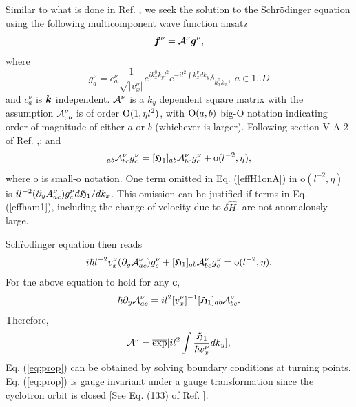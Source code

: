 \documentclass[aps, prb, showpacs, twocolumn, notitlepage, superscriptaddress]{revtex4-1}
\begin{document}
Similar to what is done in Ref. , we seek the solution to the Schr\"odinger equation using the following multicomponent wave function ansatz
\begin{equation}
\boldsymbol{f}^\nu={\cal A}^\nu\boldsymbol{g}^\nu,
\end{equation}
where 
\begin{equation}
g_a^\nu=c_{a}^\nu\frac{1}{\sqrt{|v_x^\nu|}}e^{ik^{0}_{x}k_{y}l^{2}}e^{-il^{2}\int k_{x}^\nu dk_{y}}\delta_{k^{0}_{x}k_{x}},~a\in{1..D}
\end{equation}
and $c_a^\nu$ is $\boldsymbol{k}$ independent. ${\cal A}^\nu$ is a $k_y$ dependent square matrix with the assumption ${\cal A}_{ab}^\nu$ is of order $\text{O}(1, \eta l^2)$, with $\text{O}(a, b)$ big-O notation indicating order of magnitude of either $a$ or $b$ (whichever is larger). Following section V A 2 of Ref. ,:
and
\begin{equation}
[\effH_{1}(\bK)]_{ab}\A_{bc}^\nu g_{c}^\nu=[\effH_{1}]_{ab}\A_{bc}^\nu g_{c}^\nu+\text{o}(l^{-2}, \eta),\label{effH1onA}
\end{equation}
where $\text{o}$ is small-o notation. One term omitted in Eq. (\ref{effH1onA}) in $\text{o}(l^{-2},\eta)$ is $i l^{-2}(\partial_{y}A_{ac}^\nu)g_{c}^\nu d\mathfrak{H}_1/dk_x$. This omission can be justified if terms in Eq. ({\ref{effham1}}), including the change of velocity due to $\delta\hat{H}$, are not anomalously large.

Sch\"rodinger equation then reads 
\begin{equation}
i\hbar l^{-2} v_{x}^\nu (\partial_{y}{\cal A}_{ac}^\nu)  g_{c}^\nu+[\mathfrak{H}_{1}]_{ab}{\cal A}_{bc}^\nu g_{c}^\nu=\text{o}(l^{-2}, \eta).
\end{equation}
For the above equation to hold for any $\mathbf{c}$,
\begin{equation}
\hbar\partial_{y}{\cal A}_{ac}^\nu=il^{2}[v_{x}^\nu]^{-1}[\mathfrak{H}_{1}]_{ab}{\cal A}_{bc}^\nu.
\end{equation}
Therefore,
\begin{equation}
{\cal A}^\nu=\overline{\exp}[il^{2}\int\frac{\mathfrak{H}_{1}}{\hbar v_{x}^\nu}dk_{y}],
\end{equation}
Eq. ({\ref{eq:prop}}) can be obtained by solving boundary conditions at turning points. Eq. ({\ref{eq:prop}}) is gauge invariant under a gauge transformation since the cyclotron orbit is closed [See Eq. (133) of Ref. ].
\end{document}
